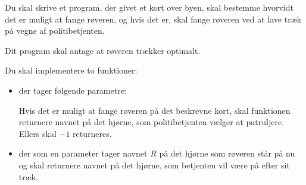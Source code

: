 \documentclass{boi2014-dk}
\begin{document}
    \Task
    Du skal skrive et program, der givet et kort over byen, skal
    bestemme hvorvidt det er muligt at fange røveren, og hvis det
    er, skal fange røveren ved at lave træk på vegne af
    politibetjenten.

	Dit program skal antage at røveren trækker optimalt.

    \Implementation
    Du skal implementere to funktioner:
    \begin{itemize}
        \item {} der tager følgende parametre:
            Hvis det er muligt at fange røveren på det beskrevne kort, skal
            funktionen  returnere navnet på det hjørne, som
            politibetjenten vælger at patruljere. Ellers skal $-1$
            returneres.

        \item {} der som en parameter tager navnet $R$
		      på det hjørne som røveren står på nu og skal returnere
		      navnet på det hjørne, som betjenten vil være på efter sit
		      træk.
    \end{itemize}
\end{document}
